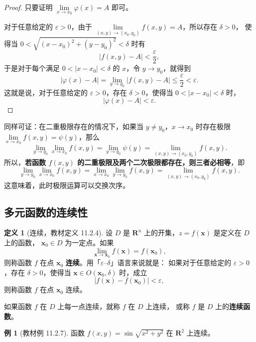 \documentclass[11pt]{ctexart}
\theoremstyle{plain}
\theoremstyle{definition}
\newtheorem{defn}[thm]{定义}
\newtheorem{ex}[thm]{例}
\theoremstyle{remark}
\begin{document}
\begin{proof}
只要证明 \(\lim\limits_{x\to x_0}\varphi(x)=A\) 即可。

对于任意给定的 \(\varepsilon>0\)，由于
\(\lim\limits_{(x,y)\to(x_0,y_0)}f(x,y)=A\)，所以存在 \(\delta>0\)，
使得当 \(0<\sqrt{(x-x_0)^2+(y-y_0)^2}<\delta\) 时有
\[
  |f(x,y)-A|<\frac{\varepsilon}{2},
\]
于是对于每个满足 \(0<|x-x_0|<\delta\) 的 \(x\)，令 \(y\to y_0\)，就得到
\[
  |\varphi(x)-A|=\lim_{y\to y_0}|f(x,y)-A|\le\frac{\varepsilon}{2}<\varepsilon .
\]
这就是说，对于任意给定的 \(\varepsilon>0\)，存在 \(\delta>0\)，使得当
\(0<|x-x_0|<\delta\) 时，
\[
  |\varphi(x)-A|<\varepsilon .
\]
\end{proof}

同样可证：在二重极限存在的情况下，如果当 \(y\neq y_0\)，\(x\to x_0\) 时存在极限
\(\lim\limits_{x\to x_0}f(x,y)=\psi(y)\)，那么
\[
  \lim_{y\to y_0}\lim_{x\to x_0}f(x,y)=\lim_{y\to y_0}\psi(y)
  =\lim_{(x,y)\to(x_0,y_0)}f(x,y).
\]
所以，\textbf{若函数 \(f(x,y)\) 的二重极限及两个二次极限都存在，则三者必相等}，即
\[
  \lim_{y\to y_0}\lim_{x\to x_0}f(x,y)
  =\lim_{x\to x_0}\lim_{y\to y_0}f(x,y)
  =\lim_{(x,y)\to(x_0,y_0)}f(x,y).
\]
这意味着，此时极限运算可以交换次序。

\subsection{多元函数的连续性}

\begin{defn}[连续，教材定义 11.2.4]\label{def:cont}
设 \(D\) 是 \(\mathbf{R}^n\) 上的开集，\(z=f(\boldsymbol{x})\) 是定义在 \(D\) 上的函数，
\(\boldsymbol{x}_0\in D\) 为一定点。如果
\[
  \lim_{\boldsymbol{x}\to\boldsymbol{x}_0}f(\boldsymbol{x})=f(\boldsymbol{x}_0),
\]
则称函数 \(f\) 在点 \(\boldsymbol{x}_0\) \textbf{连续}。用「\(\varepsilon\)--\(\delta\)」语言来说就是：
如果对于任意给定的 \(\varepsilon>0\)，存在 \(\delta>0\)，使得当
\(\boldsymbol{x}\in O(\boldsymbol{x}_0,\delta)\) 时，成立
\[
  |f(\boldsymbol{x})-f(\boldsymbol{x}_0)|<\varepsilon,
\]
则称函数 \(f\) 在点 \(\boldsymbol{x}_0\) 连续。

如果函数 \(f\) 在 \(D\) 上每一点连续，就称 \(f\) 在 \(D\) 上连续，
或称 \(f\) 是 \(D\) 上的\textbf{连续函数}。
\end{defn}

\begin{ex}[教材例 11.2.7]\label{ex:cont1}
函数 \(f(x,y)=\sin\sqrt{x^2+y^2}\) 在 \(\mathbf{R}^2\) 上连续。
\end{ex}
\end{document}
